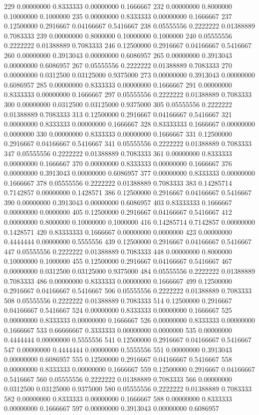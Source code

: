 \documentclass{article}
\begin{document}
\begin{Schunk}
\begin{Soutput}
229 0.00000000 0.8333333 0.00000000 0.1666667
232 0.00000000 0.8000000 0.10000000 0.1000000
235 0.00000000 0.8333333 0.00000000 0.1666667
237 0.12500000 0.2916667 0.04166667 0.5416667
238 0.05555556 0.2222222 0.01388889 0.7083333
239 0.00000000 0.8000000 0.10000000 0.1000000
240 0.05555556 0.2222222 0.01388889 0.7083333
246 0.12500000 0.2916667 0.04166667 0.5416667
260 0.00000000 0.3913043 0.00000000 0.6086957
265 0.00000000 0.3913043 0.00000000 0.6086957
267 0.05555556 0.2222222 0.01388889 0.7083333
270 0.00000000 0.0312500 0.03125000 0.9375000
273 0.00000000 0.3913043 0.00000000 0.6086957
285 0.00000000 0.8333333 0.00000000 0.1666667
291 0.00000000 0.8333333 0.00000000 0.1666667
297 0.05555556 0.2222222 0.01388889 0.7083333
300 0.00000000 0.0312500 0.03125000 0.9375000
305 0.05555556 0.2222222 0.01388889 0.7083333
313 0.12500000 0.2916667 0.04166667 0.5416667
321 0.00000000 0.8333333 0.00000000 0.1666667
328 0.83333333 0.1666667 0.00000000 0.0000000
330 0.00000000 0.8333333 0.00000000 0.1666667
331 0.12500000 0.2916667 0.04166667 0.5416667
341 0.05555556 0.2222222 0.01388889 0.7083333
347 0.05555556 0.2222222 0.01388889 0.7083333
361 0.00000000 0.8333333 0.00000000 0.1666667
370 0.00000000 0.8333333 0.00000000 0.1666667
376 0.00000000 0.3913043 0.00000000 0.6086957
377 0.00000000 0.8333333 0.00000000 0.1666667
378 0.05555556 0.2222222 0.01388889 0.7083333
383 0.14285714 0.7142857 0.00000000 0.1428571
386 0.12500000 0.2916667 0.04166667 0.5416667
390 0.00000000 0.3913043 0.00000000 0.6086957
403 0.83333333 0.1666667 0.00000000 0.0000000
405 0.12500000 0.2916667 0.04166667 0.5416667
412 0.00000000 0.8000000 0.10000000 0.1000000
416 0.14285714 0.7142857 0.00000000 0.1428571
420 0.83333333 0.1666667 0.00000000 0.0000000
423 0.00000000 0.4444444 0.00000000 0.5555556
439 0.12500000 0.2916667 0.04166667 0.5416667
447 0.05555556 0.2222222 0.01388889 0.7083333
448 0.00000000 0.8000000 0.10000000 0.1000000
455 0.12500000 0.2916667 0.04166667 0.5416667
467 0.00000000 0.0312500 0.03125000 0.9375000
484 0.05555556 0.2222222 0.01388889 0.7083333
486 0.00000000 0.8333333 0.00000000 0.1666667
499 0.12500000 0.2916667 0.04166667 0.5416667
506 0.05555556 0.2222222 0.01388889 0.7083333
508 0.05555556 0.2222222 0.01388889 0.7083333
514 0.12500000 0.2916667 0.04166667 0.5416667
524 0.00000000 0.8333333 0.00000000 0.1666667
525 0.00000000 0.8333333 0.00000000 0.1666667
526 0.00000000 0.8333333 0.00000000 0.1666667
533 0.66666667 0.3333333 0.00000000 0.0000000
535 0.00000000 0.4444444 0.00000000 0.5555556
541 0.12500000 0.2916667 0.04166667 0.5416667
547 0.00000000 0.4444444 0.00000000 0.5555556
551 0.00000000 0.3913043 0.00000000 0.6086957
555 0.12500000 0.2916667 0.04166667 0.5416667
558 0.00000000 0.8333333 0.00000000 0.1666667
559 0.12500000 0.2916667 0.04166667 0.5416667
560 0.05555556 0.2222222 0.01388889 0.7083333
566 0.00000000 0.0312500 0.03125000 0.9375000
580 0.05555556 0.2222222 0.01388889 0.7083333
582 0.00000000 0.8333333 0.00000000 0.1666667
588 0.00000000 0.8333333 0.00000000 0.1666667
597 0.00000000 0.3913043 0.00000000 0.6086957
\end{Soutput}
\end{Schunk}
\end{document}
